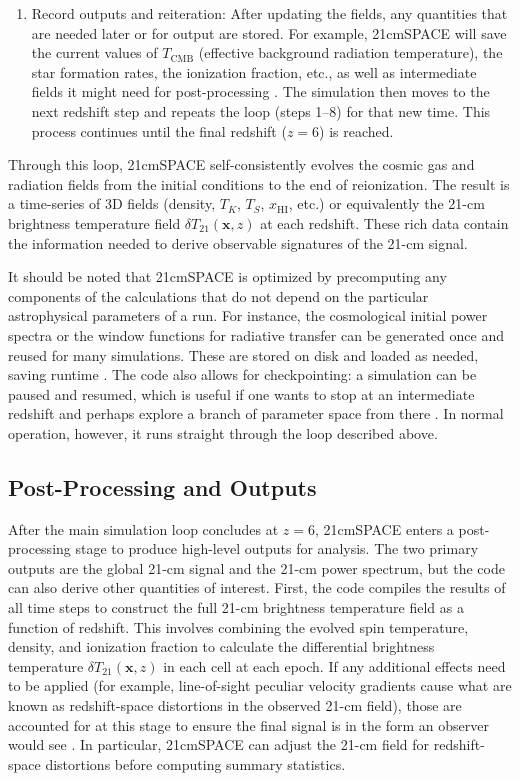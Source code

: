 \documentclass[floats,floatfix,showpacs,amssymb,prd,superscriptaddress,nofootinbib]{revtex4-2} %
\begin{document}
\begin{enumerate}
    \item Record outputs and reiteration: After updating the fields, any quantities that are needed later or for output are stored. For example, 21cmSPACE will save the current values of $T_{\text{CMB}}$ (effective background radiation temperature), the star formation rates, the ionization fraction, etc., as well as intermediate fields it might need for post-processing \citep{gessey-jones_2024}. The simulation then moves to the next redshift step and repeats the loop (steps 1–8) for that new time. This process continues until the final redshift ($z=6$) is reached.
\end{enumerate}

Through this loop, 21cmSPACE self-consistently evolves the cosmic gas and radiation fields from the initial conditions to the end of reionization. The result is a time-series of 3D fields (density, $T_K$, $T_S$, $x_{\mathrm{HI}}$, etc.) or equivalently the 21-cm brightness temperature field $\delta T_{21}(\mathbf{x}, z)$ at each redshift. These rich data contain the information needed to derive observable signatures of the 21-cm signal.

It should be noted that 21cmSPACE is optimized by precomputing any components of the calculations that do not depend on the particular astrophysical parameters of a run. For instance, the cosmological initial power spectra or the window functions for radiative transfer can be generated once and reused for many simulations. These are stored on disk and loaded as needed, saving runtime \citep{gessey-jones_2024}. The code also allows for checkpointing: a simulation can be paused and resumed, which is useful if one wants to stop at an intermediate redshift and perhaps explore a branch of parameter space from there \citep{gessey-jones_2024}. In normal operation, however, it runs straight through the loop described above.

\subsection{Post-Processing and Outputs}

After the main simulation loop concludes at $z=6$, 21cmSPACE enters a post-processing stage to produce high-level outputs for analysis. The two primary outputs are the global 21-cm signal and the 21-cm power spectrum, but the code can also derive other quantities of interest. First, the code compiles the results of all time steps to construct the full 21-cm brightness temperature field as a function of redshift. This involves combining the evolved spin temperature, density, and ionization fraction to calculate the differential brightness temperature $\delta T_{21}(\mathbf{x}, z)$ in each cell at each epoch. If any additional effects need to be applied (for example, line-of-sight peculiar velocity gradients cause what are known as redshift-space distortions in the observed 21-cm field), those are accounted for at this stage to ensure the final signal is in the form an observer would see \citep{gessey-jones_2024}. In particular, 21cmSPACE can adjust the 21-cm field for redshift-space distortions before computing summary statistics. 
\end{document}
